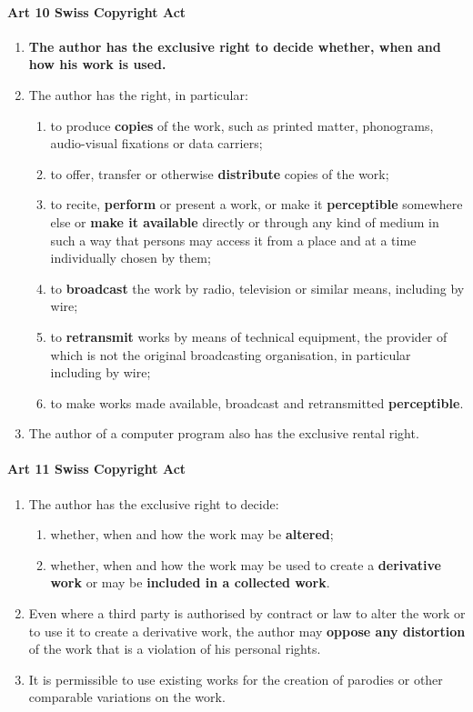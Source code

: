 \documentclass[11pt]{article}
\theoremstyle{definition}
\begin{document}
\paragraph{Art 10 Swiss Copyright Act}
\begin{enumerate}[label=\arabic*]
	\item \textbf{The author has the exclusive right to decide whether, when and how his work is used.}
	\item The author has the right, in particular:
	\begin{enumerate}[label=\alph*.]
		\item to produce \textbf{copies} of the work, such as printed matter, phonograms, audio-visual fixations or data carriers;
		\item to offer, transfer or otherwise \textbf{distribute} copies of the work;
		\item to recite, \textbf{perform} or present a work, or make it \textbf{perceptible} somewhere else or \textbf{make it available} directly or through any kind of medium in such a way that persons may access it from a place and at a time individually chosen by them;
		\item to \textbf{broadcast} the work by radio, television or similar means, including by wire;
		\item to \textbf{retransmit} works by means of technical equipment, the provider of which is not the original broadcasting organisation, in particular including by wire;
		\item to make works made available, broadcast and retransmitted \textbf{perceptible}.
	\end{enumerate}
	\item The author of a computer program also has the exclusive rental right.
\end{enumerate}

\paragraph{Art 11 Swiss Copyright Act}
\begin{enumerate}[label=\arabic*]
	\item The author has the exclusive right to decide:
	\begin{enumerate}[label=\alph*.]
		\item whether, when and how the work may be \textbf{altered};
		\item whether, when and how the work may be used to create a \textbf{derivative work} or may be \textbf{included in a collected work}.
	\end{enumerate}
	\item Even where a third party is authorised by contract or law to alter the work or to use it to create a derivative work, the author may \textbf{oppose any distortion} of the work that is a violation of his personal rights.
	\item It is permissible to use existing works for the creation of parodies or other comparable variations on the work.
\end{enumerate}
\end{document}
